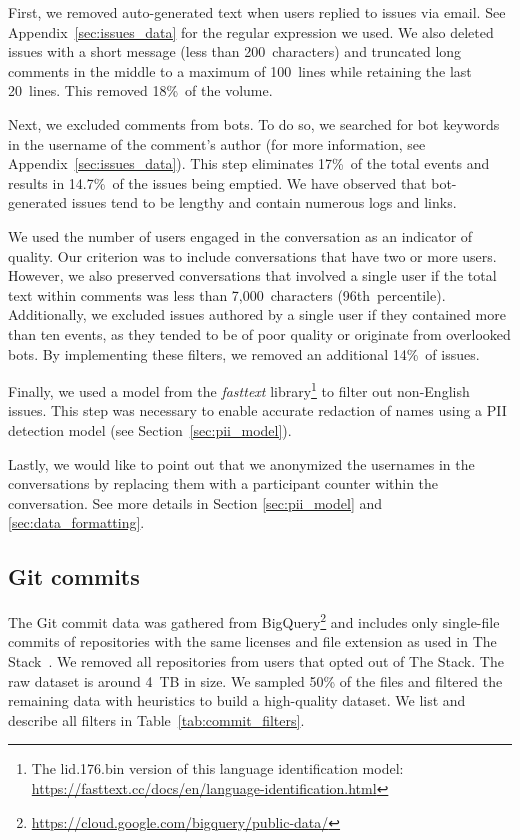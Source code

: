 \begin{inparaenum}[1)]
\item First, we removed auto-generated text when users replied to issues via email. See Appendix~\ref{sec:issues_data} for the regular expression we used. We also deleted issues with a short message (less than 200~characters) and truncated long comments in the middle to a maximum of 100~lines while retaining the last 20~lines. This removed 18\%~of the volume.
\item Next, we excluded comments from bots. To do so,  we searched for bot keywords in the username of the comment's author (for more information, see Appendix~\ref{sec:issues_data}). This step eliminates 17\%~of the total events and results in 14.7\%~of the issues being emptied. We have observed that bot-generated issues tend to be lengthy and contain numerous logs and links.
\item We used the number of users engaged in the conversation as an indicator of quality. Our criterion was to include conversations that have two or more users. However, we also preserved conversations that involved a single user if the total text within comments was less than 7,000~characters (96th~percentile). Additionally, we excluded issues authored by a single user if they contained more than ten events, as they tended to be of poor quality or originate from overlooked bots. By implementing these filters, we removed an additional 14\%~of issues. 

\item Finally, we used a model from the \textit{fasttext} library\footnote{The lid.176.bin version of this language identification model: \url{https://fasttext.cc/docs/en/language-identification.html}} to filter out non-English issues. This step was necessary to enable accurate redaction of names using a PII detection model (see Section~\ref{sec:pii_model}). 

Lastly, we would like to point out that we anonymized the usernames in the conversations by replacing them with a participant counter within the conversation. See more details in Section \ref{sec:pii_model} and \ref{sec:data_formatting}. 
\end{inparaenum}

\subsection{Git commits}
\label{sec:commits}
The Git commit data was gathered from BigQuery\footnote{\url{https://cloud.google.com/bigquery/public-data/}} and includes only single-file commits of repositories with the same licenses and file extension as used in The Stack~\citep{Kocetkov2022TheStack}. We removed all repositories from users that opted out of The Stack. The raw dataset is around 4~TB in size. We sampled 50\% of the files and filtered the remaining data with heuristics to build a high-quality dataset. We list and describe all filters in Table~\ref{tab:commit_filters}. 

